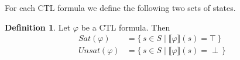\documentclass[12pt]{article}
\theoremstyle{definition}
\newtheorem{definition}{Definition}
\newcommand{\satisfaction}[1]{\llbracket #1 \rrbracket}
\begin{document}
\section{}

For each CTL formula we define the following two sets of states.

\begin{definition}
Let $\varphi$ be a CTL formula.  Then
\begin{align*}
\mathit{Sat}(\varphi) & = \{\, s \in S \mid \satisfaction{\varphi}(s) = \top \,\}\\
\mathit{Unsat}(\varphi) & = \{\, s \in S \mid \satisfaction{\varphi}(s) = \perp \,\}
\end{align*}
\end{definition}
\end{document}

